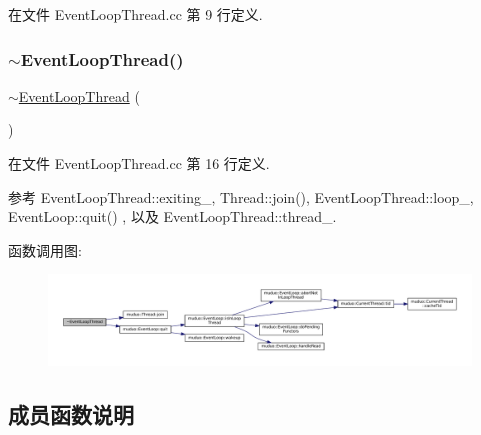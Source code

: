 在文件 Event\+Loop\+Thread.\+cc 第 9 行定义.

\mbox{\label{classmuduo_1_1EventLoopThread_af946ac1087e0c7617b0704ebde55332c}} 
\subsubsection{\texorpdfstring{$\sim$\+Event\+Loop\+Thread()}{~EventLoopThread()}}
{\footnotesize\ttfamily $\sim$\hyperlink{classmuduo_1_1EventLoopThread}{Event\+Loop\+Thread} (\begin{DoxyParamCaption}{ }\end{DoxyParamCaption})}



在文件 Event\+Loop\+Thread.\+cc 第 16 行定义.



参考 Event\+Loop\+Thread\+::exiting\+\_\+, Thread\+::join(), Event\+Loop\+Thread\+::loop\+\_\+, Event\+Loop\+::quit() , 以及 Event\+Loop\+Thread\+::thread\+\_\+.

函数调用图\+:
\nopagebreak
\begin{figure}[H]
\begin{center}
\leavevmode
\includegraphics[width=350pt]{classmuduo_1_1EventLoopThread_af946ac1087e0c7617b0704ebde55332c_cgraph}
\end{center}
\end{figure}


\subsection{成员函数说明}
\mbox{\label{classmuduo_1_1EventLoopThread_a223c4c7a43f7d8c3e41071315efa78d1}} 
